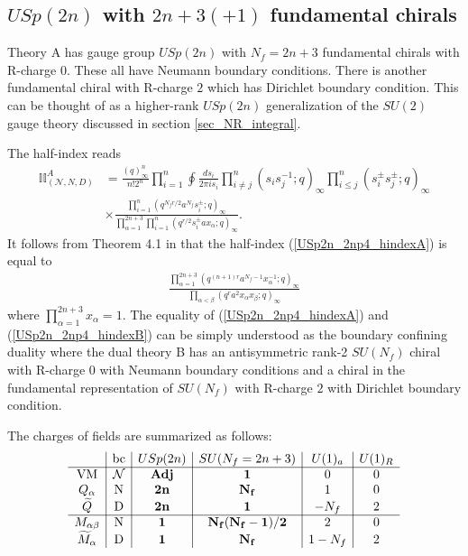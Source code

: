 \documentclass[12pt]{article}
\numberwithin{equation}{section}
\begin{document}
\subsection{$USp(2n)$ with $2n+3(+1)$ fundamental chirals}
\label{sec_USp2n_2np4_integrals}
Theory A has gauge group $USp(2n)$ with $N_f = 2n + 3$ fundamental chirals
with R-charge $0$. These all have Neumann boundary
conditions. There is another fundamental chiral with R-charge $2$ which has Dirichlet boundary condition. 
This can be thought of as a higher-rank $USp(2n)$ generalization of the $SU(2)$ gauge theory discussed in section \ref{sec_NR_integral}. 


The half-index reads
\begin{align}
\label{USp2n_2np4_hindexA}
\mathbb{II}_{(\mathcal{N},N,D)}^{A}&=
\frac{(q)_{\infty}^n}{n! 2^n} \prod_{i=1}^n \oint \frac{ds_i}{2\pi i s_i}
\prod_{i \ne j}^n (s_i s_j^{-1}; q)_{\infty} \prod_{i \le j}^n (s_i^{\pm} s_j^{\pm}; q)_{\infty}
\nonumber\\
&\times 
\frac{\prod_{i = 1}^n (q^{N_f r/2} a^{N_f} s_i^{\pm}; q)_{\infty}}{\prod_{\alpha = 1}^{2n + 3} \prod_{i = 1}^n (q^{r/2} s_i^{\pm} a x_{\alpha}; q)_{\infty}}. 
\end{align}
It follows from Theorem 4.1 in \cite{MR1147876} that 
the half-index (\ref{USp2n_2np4_hindexA}) is equal to 
\begin{align}
\label{USp2n_2np4_hindexB}
\frac{\prod_{\alpha=1}^{2n + 3} (q^{(n+1)r} a^{N_f - 1} x_{\alpha}^{-1}; q)_{\infty}}{\prod_{\alpha < \beta} (q^r a^2 x_{\alpha} x_{\beta}; q)_{\infty}}
\end{align}
where $\prod_{\alpha = 1}^{2n + 3} x_{\alpha} = 1$. 
The equality of (\ref{USp2n_2np4_hindexA}) and (\ref{USp2n_2np4_hindexB}) can be simply understood as the boundary confining duality where 
the dual theory B has an antisymmetric rank-2 $SU(N_f)$ chiral with R-charge $0$
with Neumann boundary conditions and a chiral in the fundamental representation of $SU(N_f)$
with R-charge $2$ with Dirichlet boundary condition. 

The charges of fields are summarized as follows: 
\begin{align}
\label{USp2n_2np4_charges}
\begin{array}{c|c|c|c|c|c}
& \textrm{bc} & USp(2n) & SU(N_f = 2n + 3) & U(1)_a & U(1)_R \\ \hline
\textrm{VM} & \mathcal{N} & {\bf Adj} & {\bf 1} & 0 & 0 \\
Q_{\alpha} & \textrm{N} & {\bf 2n} & {\bf N_f} & 1 & 0 \\
\widetilde{Q} & \textrm{D} & {\bf 2n} & {\bf 1} & -N_f & 2 \\
 \hline
M_{\alpha \beta} & \textrm{N} & {\bf 1} & {\bf N_f(N_f - 1)/2} & 2 & 0 \\
\widetilde{M}_{\alpha} & \textrm{D} & {\bf 1} & {\bf N_f} & 1 - N_f & 2
\end{array}
\end{align}
\end{document}
